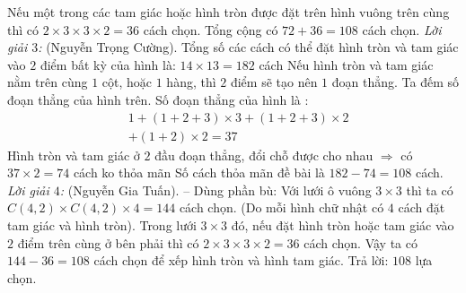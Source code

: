 \begin{multicols}{2}
	\vskip 0.1cm
	Nếu một trong các tam giác hoặc hình tròn được đặt trên hình vuông trên cùng thì có $2 \times 3 \times 3 \times 2 = 36$ cách chọn.
	\vskip 0.1cm
	Tổng cộng có $72 + 36 = 108$ cách chọn.
	\vskip 0.1cm
	\textit{Lời giải $3$:} (Nguyễn Trọng Cường).
	\vskip 0.1cm
	Tổng số các cách có thể đặt hình tròn và tam giác vào $2$ điểm bất kỳ của hình là: $14\times13 = 182$ cách
	\vskip 0.1cm
	Nếu hình tròn và tam giác nằm trên cùng $1$ cột, hoặc $1$ hàng, thì $2$ điểm sẽ tạo nên $1$ đoạn thẳng. Ta đếm số đoạn thẳng của hình trên.
	\vskip 0.1cm
	Số đoạn thẳng của hình là :
	\begin{align*}
		&1 + (1+2+3) \times 3 + (1+2+3) \times 2 \\
		&+ (1+2) \times 2 = 37
	\end{align*}
	Hình tròn và tam giác ở $2$ đầu đoạn thẳng, đổi chỗ được cho nhau $\Rightarrow$ có $37 \times 2 = 74$ cách ko thỏa mãn
	\vskip 0.1cm
	Số cách thỏa mãn đề bài là $182 - 74 = 108$ cách.
	\vskip 0.1cm
	\textit{Lời giải $4$:} (Nguyễn Gia Tuấn). -- Dùng phần bù:
	\vskip 0.1cm
	Với lưới ô vuông $3 \times 3$ thì ta có $C(4,2)\times C(4,2)\times 4 = 144$ cách chọn. (Do mỗi hình chữ nhật có $4$ cách đặt tam giác và hình tròn).
	\vskip 0.1cm
	Trong lưới $3 \times 3$ đó, nếu đặt hình tròn hoặc tam giác vào $2$ điểm trên cùng ở bên phải thì có $2 \times 3 \times  3 \times 2 = 36$ cách chọn.
	\vskip 0.1cm
	Vậy ta có $144 - 36 = 108$ cách chọn để xếp hình tròn và hình tam giác.
	\vskip 0.1cm
	Trả lời: $108$ lựa chọn.
\end{multicols}
\newpage
\begingroup
{}  
